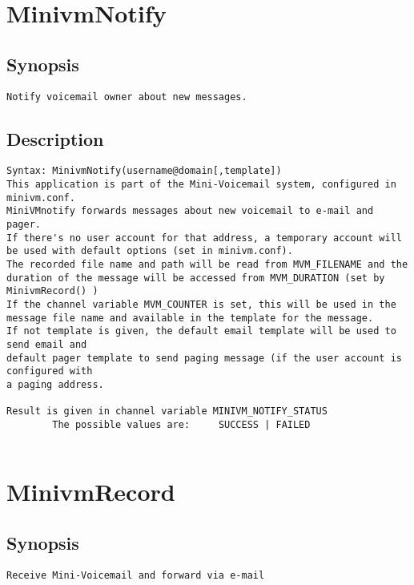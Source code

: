 \section{MinivmNotify}
\subsection{Synopsis}
\begin{verbatim}
Notify voicemail owner about new messages.
\end{verbatim}
\subsection{Description}
\begin{verbatim}
Syntax: MinivmNotify(username@domain[,template])
This application is part of the Mini-Voicemail system, configured in minivm.conf.
MiniVMnotify forwards messages about new voicemail to e-mail and pager.
If there's no user account for that address, a temporary account will
be used with default options (set in minivm.conf).
The recorded file name and path will be read from MVM_FILENAME and the 
duration of the message will be accessed from MVM_DURATION (set by MinivmRecord() )
If the channel variable MVM_COUNTER is set, this will be used in the
message file name and available in the template for the message.
If not template is given, the default email template will be used to send email and
default pager template to send paging message (if the user account is configured with
a paging address.

Result is given in channel variable MINIVM_NOTIFY_STATUS
        The possible values are:     SUCCESS | FAILED


\end{verbatim}


\section{MinivmRecord}
\subsection{Synopsis}
\begin{verbatim}
Receive Mini-Voicemail and forward via e-mail
\end{verbatim}
